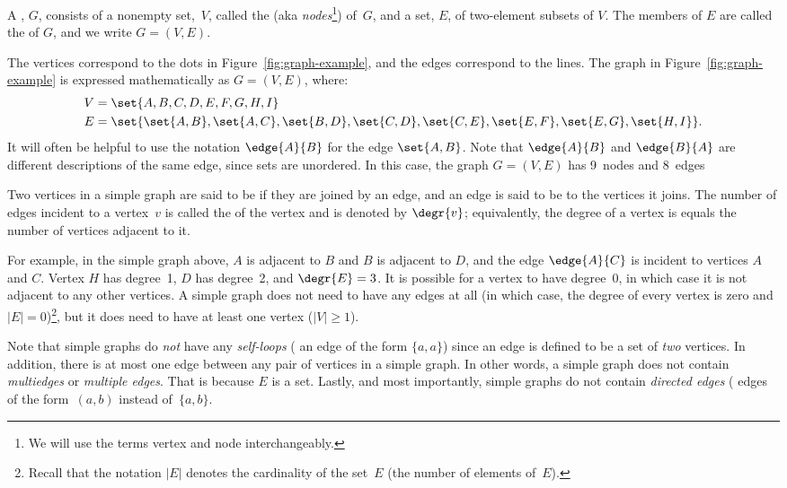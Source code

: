 \begin{definition}\label{graphdef}
A , $G$, consists of a nonempty set,~$V$, called
the  (aka \emph{nodes}\footnote{We will use the terms
  vertex and node interchangeably.}) of~$G$, and a set, $E$, of
two-element subsets of $V$.  The members of $E$ are called the
 of $G$, and we write $G = (V, E)$.
\end{definition}
The vertices correspond to the dots in Figure~\ref{fig:graph-example},
and the edges correspond to the lines.  The graph in
Figure~\ref{fig:graph-example} is expressed mathematically as $G = (V,
E)$, where:
\begin{align*}
V & =  \set{A, B, C, D, E, F, G, H, I} \\
E & =  \set{ \set{A, B}, \set{A, C}, \set{B, D}, \set{C, D},
              \set{C, E}, \set{E, F}, \set{E, G}, \set{H, I} }.
\end{align*}
It will often be helpful to use the notation $\edge{A}{B}$ for the
edge $\set{A,B}$.  Note that $\edge{A}{B}$ and $\edge{B}{A}$ are
different descriptions of the same edge, since sets are unordered.  In
this case, the graph $G = (V, E)$ has 9~nodes and 8~edges

\begin{definition}
Two vertices in a simple graph are said to be  if they are
joined by an edge, and an edge is said to be  to the
vertices it joins.  The number of edges incident to a vertex~$v$ is called the
 of the vertex and is denoted by $\degr{v}$;
equivalently, the degree of a vertex is
equals the number of vertices adjacent to it.
\end{definition}
For example, in the simple graph above, $A$ is adjacent to $B$ and $B$
is adjacent to $D$, and the edge $\edge{A}{C}$ is incident to vertices
$A$ and $C$.  Vertex $H$ has degree~1, $D$ has degree~2, and $\degr{E}
= 3$.  It is possible for a vertex to have degree~0, in which case it
is not adjacent to any other vertices.  A simple graph does not need
to have any edges at all (in which case, the degree of every vertex is
zero and $|E| = 0$)\footnote{Recall that the notation $|E|$ denotes the
  cardinality of the set~$E$ (\ie the number of elements of~$E$).},
but it does need to have at least one vertex (\ie $|V| \ge 1$).

Note that simple graphs do \emph{not} have any \emph{self-loops} (\ie
an edge of the form $\{a, a\}$) since an edge is defined to be a set
of \emph{two} vertices.  In addition, there is at most one edge
between any pair of vertices in a simple graph.  In other words, a
simple graph does not contain \emph{multiedges} or \emph{multiple
  edges}.  That is because $E$ is a set.  Lastly, and most
importantly, simple graphs do not contain \emph{directed edges} (\ie
edges of the form~$(a, b)$ instead of~$\{a, b\}$.

